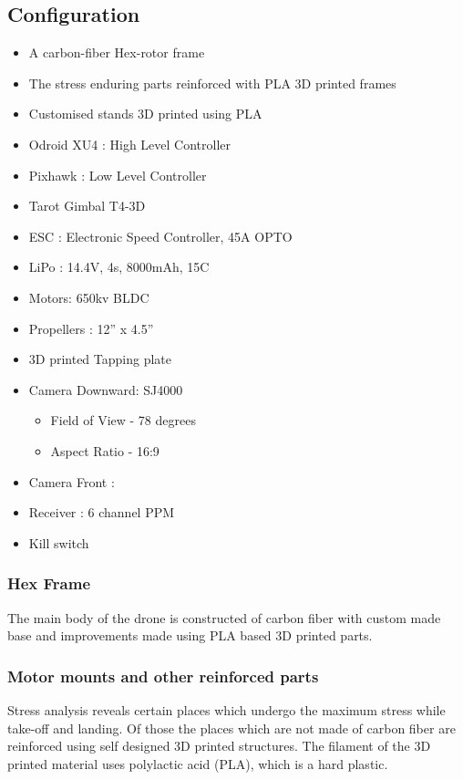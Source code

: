 \documentclass[12pt]{article}
\begin{document}
\subsection{Configuration}
\begin{itemize}
	\item A carbon-fiber Hex-rotor frame
	\item The stress enduring parts reinforced with PLA 3D printed frames
	\item Customised stands 3D printed using PLA
    \item Odroid XU4 : High Level Controller
    \item Pixhawk : Low Level Controller
    \item Tarot Gimbal T4-3D
    \item ESC     : Electronic Speed Controller, 45A OPTO
    \item LiPo : 14.4V, 4s, 8000mAh, 15C
    \item Motors: 650kv BLDC
    \item Propellers : 12” x 4.5”
    \item 3D printed Tapping plate
    \item Camera Downward: SJ4000
    \begin{itemize}
    	\item Field of View - 78 degrees
    	\item Aspect Ratio - 16:9
    \end{itemize}
    \item Camera Front : 
    \item Receiver : 6 channel PPM
    \item Kill switch 
\end{itemize}

	\subsubsection{Hex Frame}
	The main body of the drone is constructed of carbon fiber with custom made base and improvements made using PLA based 3D printed parts. 
	\subsubsection{Motor mounts and other reinforced parts}
	Stress analysis reveals certain places which undergo the maximum stress while take-off and landing. Of those the places which are not made of carbon fiber are reinforced using self designed 3D printed structures. The filament of the 3D printed material uses polylactic acid (PLA), which is a hard plastic.
\end{document}
